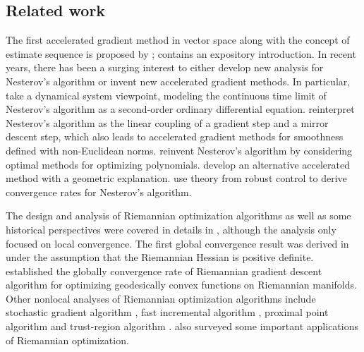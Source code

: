 \subsection{Related work}
The first accelerated gradient method in vector space along with the concept of estimate sequence is proposed by \citet{nesterov1983method}; \citep[Chapter 2.2.1]{nesterov2004introductory} contains an expository introduction. In recent years, there has been a surging interest to either develop new analysis for Nesterov's algorithm or invent new accelerated gradient methods. In particular, \citet{su2014differential,flammarion2015averaging,wibisono2016variational} take a dynamical system viewpoint, modeling the continuous time limit of Nesterov's algorithm as a second-order ordinary differential equation. \citet{allen2014linear} reinterpret Nesterov's algorithm as the linear coupling of a gradient step and a mirror descent step, which also leads to accelerated gradient methods for smoothness defined with non-Euclidean norms. \citet{arjevani2015lower} reinvent Nesterov's algorithm by considering optimal methods for optimizing polynomials. \citet{bubeck2015geometric} develop an alternative accelerated method with a geometric explanation. \citet{lessard2016analysis} use theory from robust control to derive convergence rates for Nesterov's algorithm.


The design and analysis of Riemannian optimization algorithms as well as some historical perspectives were covered in details in \citep{absil2009optimization}, although the analysis only focused on local convergence. The first global convergence result was derived in \citep{udriste1994convex} under the assumption that the Riemannian Hessian is positive definite. \citet{zhang2016first} established the globally convergence rate of Riemannian gradient descent algorithm for optimizing geodesically convex functions on Riemannian manifolds. Other nonlocal analyses of Riemannian optimization algorithms include stochastic gradient algorithm \citep{zhang2016first}, fast incremental algorithm \citep{zhang2016riemannian, kasai2016riemannian}, proximal point algorithm \citep{ferreira2002proximal} and trust-region algorithm \citep{boumal2016global}. \citet[Chapter 2]{absil2009optimization} also surveyed some important applications of Riemannian optimization.

